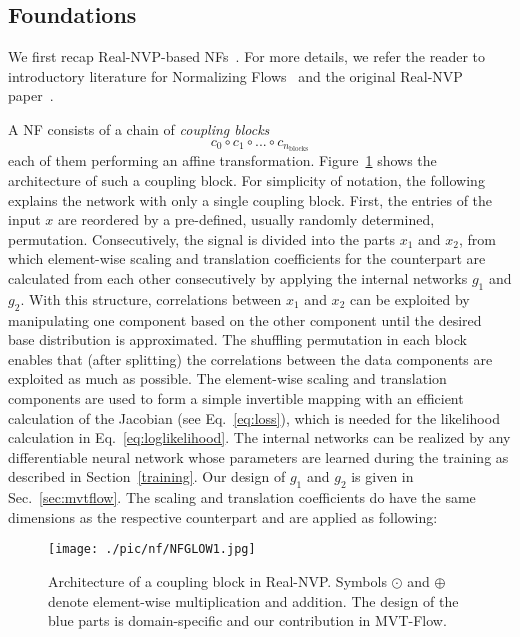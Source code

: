 \documentclass[journal]{IEEEtran}
\begin{document}
\subsection{Foundations}
\label{sec:foundations}
We first recap Real-NVP-based NFs~\cite{realnvp}.
{For more details, we refer the reader to introductory literature for Normalizing Flows~\cite{papamakarios2021normalizing,kobyzev2020normalizing, nf} and the original Real-NVP paper~\cite{realnvp}.}

A NF consists of a chain of \textit{coupling blocks} $$c_0 \circ c_1 \circ ... \circ c_{n_\mathrm{blocks}} $$ each of them performing an affine transformation.
Figure~\ref{fig:realnvp} shows the architecture of such a coupling block.
For simplicity of notation, the following explains the network with only a single coupling block.
First, the entries of the input $x$ are reordered by a pre-defined, usually randomly determined, permutation.
Consecutively, the signal is divided into the parts $x_1$ and $x_2$, from which {element-wise} scaling and translation coefficients for the counterpart are calculated from each other consecutively by applying the internal networks $g_{1}$ and  $g_{2}$.
{With this structure, correlations between $x_1$ and $x_2$ can be exploited by manipulating one component based on the other component until the desired base distribution is approximated. 
The shuffling permutation in each block enables that (after splitting) the correlations between the data components are exploited as much as possible.
The element-wise scaling and translation components are used to form a simple invertible mapping with an efficient calculation of the Jacobian (see Eq.~\ref{eq:loss}), which is needed for the likelihood calculation in Eq.~\ref{eq:loglikelihood}.
The internal networks can be realized by any differentiable neural network whose parameters are learned during the training as described in Section~\ref{training}.
Our design of $g_{1}$ and  $g_{2}$ is given in Sec.~\ref{sec:mvtflow}.}
The scaling and translation coefficients do have the same dimensions as the respective counterpart and are applied as following:

\begin{figure}[]
    \centering
    \texttt{[image: ./pic/nf/NFGLOW1.jpg]}
    \caption{Architecture of a coupling block in Real-NVP.
    Symbols $\odot$ and $\oplus$ denote element-wise multiplication and addition.
    The design of the blue parts is domain-specific and our contribution in MVT-Flow.}
    \label{fig:realnvp}
    \vspace{-2mm}
\end{figure}
\end{document}
